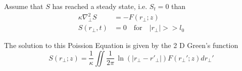 \documentclass[a4paper, 12pt]{amsbook}
\begin{document}
Assume that $S$ has reached a steady state, i.e. $S_{t} = 0 $ than
\begin{equation*}
    \begin{aligned}
        \kappa \nabla_{\perp}^2 S &= -F(r_{\perp}; z) \\
        S(r_{\perp},t) &= 0 \quad \mbox{for} \quad |r_\perp| >> l_0
    \end{aligned} 
\end{equation*}

The solution to this Poission Equation is given by the 2 D Green's function
\begin{equation*}
S(r_{\perp};z) = \frac{1}{\kappa} \iint \frac{1}{2\pi}\, \ln{(|r_{\perp} - r'_{\perp}|)}  F(r_{\perp}'; z)  d r_{\perp}'
\end{equation*}
\end{document}
